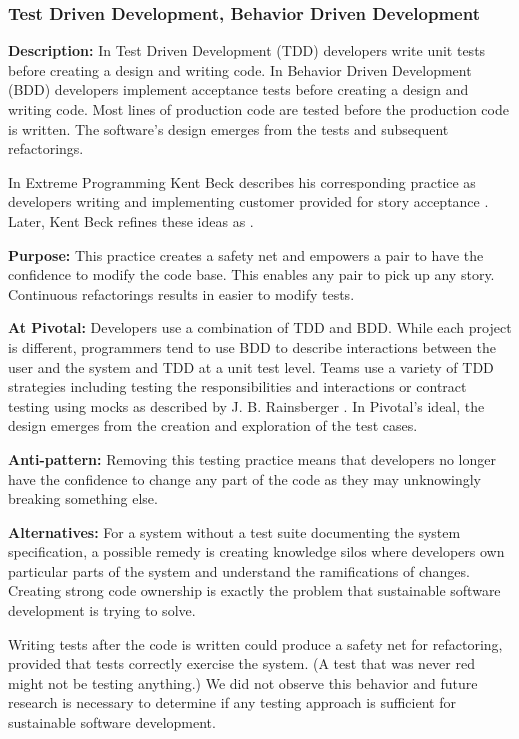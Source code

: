 \begin{table}[]
\subsubsection{Test Driven Development, Behavior Driven Development}
\textbf{Description:} In Test Driven Development (TDD) developers write unit tests before creating a design and writing code. In Behavior Driven Development (BDD) developers implement acceptance tests before creating a design and writing code. Most lines of production code are tested before the production code is written. The software's design emerges from the tests and subsequent refactorings.

In Extreme Programming Kent Beck describes his corresponding  practice as developers writing  and implementing customer provided  for story acceptance \cite{ExtremeProgramming2000}. Later, Kent Beck refines these ideas as  \cite{ExtremeProgramming2004}. 

\textbf{Purpose:} This practice creates a safety net and empowers a pair to have the confidence to modify the code base. This enables any pair to pick up any story. Continuous refactorings results in easier to modify tests.

\textbf{At Pivotal:} Developers use a combination of TDD and BDD. While each project is different, programmers tend to use BDD to describe interactions between the user and the system and TDD at a unit test level. Teams use a variety of TDD strategies including testing the responsibilities and interactions \cite{Goose} or contract testing using mocks as described by J. B. Rainsberger \cite{RainsbergerIntegrationTestsYouTube}. In Pivotal's ideal, the design emerges from the creation and exploration of the test cases.  

\textbf{Anti-pattern:} Removing this testing practice means that developers no longer have the confidence to change any part of the code as they may unknowingly breaking something else. 

\textbf{Alternatives:} For a system without a test suite documenting the system specification, a possible remedy is creating knowledge silos where developers own particular parts of the system and understand the ramifications of changes. Creating strong code ownership is exactly the problem that sustainable software development is trying to solve.

Writing tests after the code is written could produce a safety net for refactoring, provided that tests correctly exercise the system. (A test that was never red might not be testing anything.) We did not observe this behavior and future research is necessary to determine if any testing approach is sufficient for sustainable software development.


\end{table}
